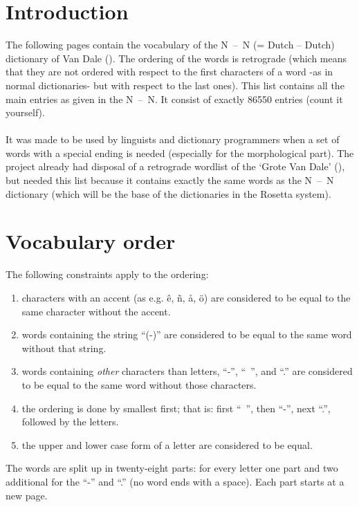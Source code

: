 


   \RosSupersedes{-}

   \MakeRosTitle

\section{Introduction}
 The following pages contain the vocabulary of the N~--~N (= Dutch -- Dutch) 
 dictionary of 
 Van Dale (\cite{st:groot}). The ordering of the words is retrograde (which 
 means that they are not ordered with respect to the first characters of a 
 word -as in normal dictionaries- but with respect to the last ones). 
 This list contains all the main entries as given in the 
 N~--~N. It consist of exactly 86550 entries (count it yourself).\\ \\
 It was made to be used by linguists and dictionary programmers when a set 
 of words with a special ending is needed (especially for the morphological 
 part). The project already had disposal of a retrograde wordlist of the 
 `Grote Van Dale' (\cite{ni:retro}), but needed this list because it 
 contains exactly the same words as the N~--~N dictionary 
 (which will be the base of the dictionaries in the Rosetta system). 
\section{Vocabulary order}
 The following constraints apply to the ordering:
 \begin{enumerate}
  \item characters with an accent (as e.g. \^{e}, \~{n}, \aa, \"{o}) are 
  considered to be equal to the same character without the accent.
  \item words containing the string ``(-)'' are considered to be equal to the 
  same word without that string.
  \item words containing {\em other} characters than letters, ``-'', ``~'', and 
  ``.'' are considered to be equal to the same word without those characters.
  \item the ordering is done by smallest first; that is: first ``~'', then 
  ``-'', next ``.'', followed by the letters.
  \item the upper and lower case form of a letter are considered to be equal.
 \end {enumerate}
 The words are split up in twenty-eight parts: for every letter one part and 
 two additional for the ``-'' and ``.'' (no word ends with a space). Each part 
 starts at a new page.
